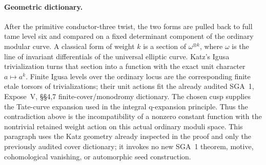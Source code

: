 \paragraph{Geometric dictionary.}
After the primitive conductor-three twist, the two forms are pulled back to
full tame level six and compared on a fixed determinant component of the
ordinary modular curve.  A classical form of weight $k$ is a section of
$\omega^{\otimes k}$, where $\omega$ is the line of invariant differentials
of the universal elliptic curve.  Katz's Igusa trivialization turns that
section into a function with the exact unit character $a\mapsto a^k$.
Finite Igusa levels over the ordinary locus are the corresponding finite
etale torsors of trivializations; their unit actions fit the already
audited SGA~1, Expose~V, \S\S4,7 finite-cover/monodromy dictionary.
The chosen cusp supplies the Tate-curve expansion used in the integral
q-expansion principle.  Thus the contradiction above is the incompatibility
of a nonzero constant function with the nontrivial retained weight action
on this actual ordinary moduli space.  This paragraph uses the Katz
geometry already inspected in the proof and only the previously audited
cover dictionary; it invokes no new SGA~1 theorem, motive, cohomological
vanishing, or automorphic seed construction.
